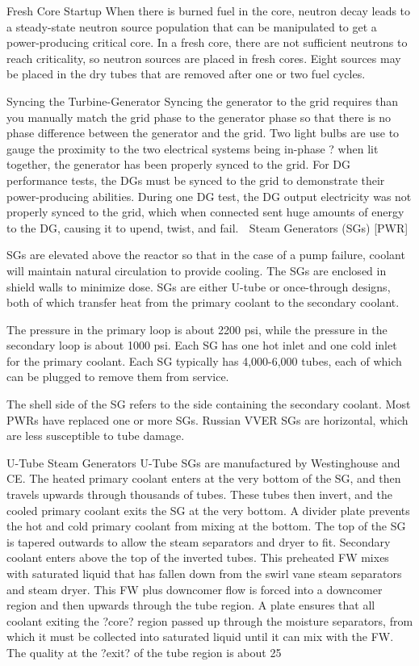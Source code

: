 \documentclass[10pt]{article}
\begin{document}
Fresh Core Startup
When there is burned fuel in the core, neutron decay leads to a steady-state neutron source population that can be manipulated to get a power-producing critical core. In a fresh core, there are not sufficient neutrons to reach criticality, so neutron sources are placed in fresh cores. Eight sources may be placed in the dry tubes that are removed after one or two fuel cycles. 

Syncing the Turbine-Generator
Syncing the generator to the grid requires than you manually match the grid phase to the generator phase so that there is no phase difference between the generator and the grid. Two light bulbs are use to gauge the proximity to the two electrical systems being in-phase ? when lit together, the generator has been properly synced to the grid. For DG performance tests, the DGs must be synced to the grid to demonstrate their power-producing abilities. During one DG test, the DG output electricity was not properly synced to the grid, which when connected sent huge amounts of energy to the DG, causing it to upend, twist, and fail. 

Steam Generators (SGs) [PWR]

SGs are elevated above the reactor so that in the case of a pump failure, coolant will maintain natural circulation to provide cooling. The SGs are enclosed in shield walls to minimize dose. SGs are either U-tube or once-through designs, both of which transfer heat from the primary coolant to the secondary coolant. 

The pressure in the primary loop is about 2200 psi, while the pressure in the secondary loop is about 1000 psi. Each SG has one hot inlet and one cold inlet for the primary coolant. Each SG typically has 4,000-6,000 tubes, each of which can be plugged to remove them from service. 

The shell side of the SG refers to the side containing the secondary coolant. Most PWRs have replaced one or more SGs. Russian VVER SGs are horizontal, which are less susceptible to tube damage. 

U-Tube Steam Generators
U-Tube SGs are manufactured by Westinghouse and CE. The heated primary coolant enters at the very bottom of the SG, and then travels upwards through thousands of tubes. These tubes then invert, and the cooled primary coolant exits the SG at the very bottom. A divider plate prevents the hot and cold primary coolant from mixing at the bottom. The top of the SG is tapered outwards to allow the steam separators and dryer to fit. Secondary coolant enters above the top of the inverted tubes. This preheated FW mixes with saturated liquid that has fallen down from the swirl vane steam separators and steam dryer. This FW plus downcomer flow is forced into a downcomer region and then upwards through the tube region. A plate ensures that all coolant exiting the ?core? region passed up through the moisture separators, from which it must be collected into saturated liquid until it can mix with the FW. The quality at the ?exit? of the tube region is about 25%
\end{document}
